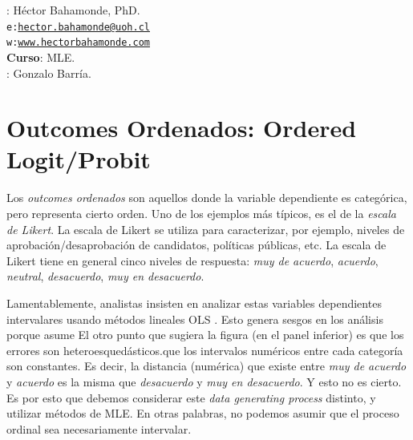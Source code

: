 \documentclass[onesided]{article}\usepackage[]{graphicx}\usepackage[]{color}
\begin{document}











\hspace{-5mm}{\bf Profesor}: H\'ector Bahamonde, PhD.\\
\texttt{e:}\href{mailto:hector.bahamonde@uoh.cl}{\texttt{hector.bahamonde@uoh.cl}}\\
\texttt{w:}\href{http://www.hectorbahamonde.com}{\texttt{www.hectorbahamonde.com}}\\
{\bf Curso}: MLE.\\
\hspace{-5mm}{\bf TA}: Gonzalo Barr\'ia.

\section{Outcomes Ordenados: Ordered Logit/Probit}


Los \emph{outcomes ordenados} son aquellos donde la variable dependiente es categ\'orica, pero representa cierto orden. Uno de los ejemplos m\'as t\'ipicos, es el de la \emph{escala de Likert}. La escala de Likert se utiliza para caracterizar, por ejemplo, niveles de aprobaci\'on/desaprobaci\'on de candidatos, pol\'iticas p\'ublicas, etc. La escala de Likert tiene en general cinco niveles de respuesta: \emph{muy de acuerdo}, \emph{acuerdo}, \emph{neutral}, \emph{desacuerdo}, \emph{muy en desacuerdo}. 

Lamentablemente, analistas insisten en analizar estas variables dependientes intervalares usando m\'etodos lineales OLS \parencite[115]{Long:1997wv}. Esto genera sesgos en los an\'alisis porque asume  El otro punto que sugiera la figura (en el panel inferior) es que los errores son heteroesqued\'asticos.que los intervalos num\'ericos entre cada categor\'ia son constantes. Es decir, la distancia (num\'erica) que existe entre  \emph{muy de acuerdo} y \emph{acuerdo} es la misma que \emph{desacuerdo} y \emph{muy en desacuerdo}. Y esto no es cierto. Es por esto que debemos considerar este \emph{data generating process} distinto, y utilizar m\'etodos de MLE. En otras palabras, no podemos asumir que el proceso ordinal sea necesariamente intervalar. 
\end{document}
